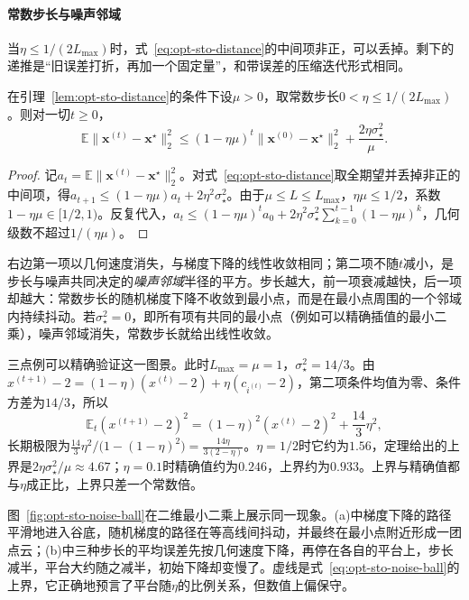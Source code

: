 \paragraph{常数步长与噪声邻域}
当$\eta\leq1/(2L_{\max})$时，式~\eqref{eq:opt-sto-distance}的中间项非正，可以丢掉。剩下的递推是“旧误差打折，再加一个固定量”，和带误差的压缩迭代形式相同。

\begin{theorem}[常数步长的期望误差]
\label{thm:opt-sto-constant-step}
在引理~\ref{lem:opt-sto-distance}的条件下设$\mu>0$，取常数步长$0<\eta\leq1/(2L_{\max})$。则对一切$t\geq0$，
\begin{equation}
\label{eq:opt-sto-noise-ball}
  \mathbb E\lVert\bm x^{(t)}-\bm x^\star\rVert_2^2\leq(1-\eta\mu)^t\lVert\bm x^{(0)}-\bm x^\star\rVert_2^2+\frac{2\eta\sigma_\star^2}{\mu}.
\end{equation}
\end{theorem}

\begin{proof}
记$a_t=\mathbb E\lVert\bm x^{(t)}-\bm x^\star\rVert_2^2$。对式~\eqref{eq:opt-sto-distance}取全期望并丢掉非正的中间项，得$a_{t+1}\leq(1-\eta\mu)a_t+2\eta^2\sigma_\star^2$。由于$\mu\leq L\leq L_{\max}$，$\eta\mu\leq1/2$，系数$1-\eta\mu\in[1/2,1)$。反复代入，$a_t\leq(1-\eta\mu)^ta_0+2\eta^2\sigma_\star^2\sum_{k=0}^{t-1}(1-\eta\mu)^k$，几何级数不超过$1/(\eta\mu)$。
\end{proof}

右边第一项以几何速度消失，与梯度下降的线性收敛相同；第二项不随$t$减小，是步长与噪声共同决定的\emph{噪声邻域}半径的平方。步长越大，前一项衰减越快，后一项却越大：常数步长的随机梯度下降不收敛到最小点，而是在最小点周围的一个邻域内持续抖动。若$\sigma_\star^2=0$，即所有项有共同的最小点（例如可以精确插值的最小二乘），噪声邻域消失，常数步长就给出线性收敛。

三点例可以精确验证这一图景。此时$L_{\max}=\mu=1$，$\sigma_\star^2=14/3$。由$x^{(t+1)}-2=(1-\eta)(x^{(t)}-2)+\eta(c_{i^{(t)}}-2)$，第二项条件均值为零、条件方差为$14/3$，所以
\[
  \mathbb E_t(x^{(t+1)}-2)^2=(1-\eta)^2(x^{(t)}-2)^2+\frac{14}3\eta^2 ,
\]
长期极限为$\frac{14}3\eta^2/\bigl(1-(1-\eta)^2\bigr)=\frac{14\eta}{3(2-\eta)}$。$\eta=1/2$时它约为$1.56$，定理给出的上界是$2\eta\sigma_\star^2/\mu\approx4.67$；$\eta=0.1$时精确值约为$0.246$，上界约为$0.933$。上界与精确值都与$\eta$成正比，上界只差一个常数倍。

图~\ref{fig:opt-sto-noise-ball}在二维最小二乘上展示同一现象。(a)中梯度下降的路径平滑地进入谷底，随机梯度的路径在等高线间抖动，并最终在最小点附近形成一团点云；(b)中三种步长的平均误差先按几何速度下降，再停在各自的平台上，步长减半，平台大约随之减半，初始下降却变慢了。虚线是式~\eqref{eq:opt-sto-noise-ball}的上界，它正确地预言了平台随$\eta$的比例关系，但数值上偏保守。

